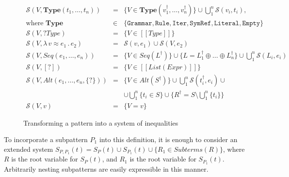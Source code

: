 \documentclass{IOS-Book-Article}     %
\newcommand{\abstr}[3]{\lambda \, #1 \approx #2 \,.\, #3}
\newcommand{\sem}[1]{[\![#1]\!]}
\newcommand{\fresh}[1]{#1^\dagger}
\newcommand{\Eq}{\mathcal{S}}
\begin{document}
\begin{figure}%
\centering%
$
\begin{array}{rcl}
\Eq(V, \mathbf{Type}(t_1, \ldots, t_n)) &=& \{V \in \mathbf{Type}(\fresh{v_1}, \ldots, \fresh{v_n})\} \cup 
\bigcup_1^n \Eq{}(v_i, t_i),\\
\mbox{where } \mathbf{Type} &\in& \{
	\mathtt{Grammar}, \mathtt{Rule}, \mathtt{Iter}, \mathtt{SymRef}, \mathtt{Literal}, \mathtt{Empty}\}\\

\Eq{}(V, ?Type) &=& \{V \in \sem{Type}\}\\

\Eq{}(V, \abstr{v}{e_1}{e_2}) &=& \Eq{}(v, e_1) \cup \Eq{}(V, e_2)\\

\Eq{}(V, Seq(e_1, \ldots, e_n)) &=& \{V \in Seq(\fresh{L})\} \cup \{ L = \fresh{L_1} \oplus \ldots \oplus \fresh{L_n}\} \cup \bigcup_1^n \Eq{}(L_i, e_i)\\

\Eq{}(V, [?]) &=& \{ V \in \sem{List(Expr)} \}\\

\Eq{}(V, Alt(e_1, \ldots, e_n, \{?\})) &=& \{V \in Alt(\fresh{S})\}
                                   \cup \bigcup_1^n \Eq{}(\fresh{t_i}, e_i) \cup \\
                               &&    
                                   \cup \bigcup_1^n \{ t_i \in S\}
                                   \cup \{ \fresh{R} = S \setminus
                                                          \bigcup_1^n\{t_i\}\}\\
\Eq{}(V, v) &=& \{V = v\}
\end{array}
$
\caption{Transforming a pattern into a system of inequalities}\label{Eq}%
\end{figure}%

To incorporate a subpattern $P_1$ into this definition, it is enough to consider an extended system $S_{P, P_1}(t) = S_P(t) \cup S_{P_1}(t) \cup \{R_1 \in Subterms(R)\}$, where $R$ is the root variable for $S_P(t)$, and $R_1$ is the root variable for $S_{P_1}(t)$. Arbitrarily nesting subpatterns are easily expressible in this manner.
\end{document}
